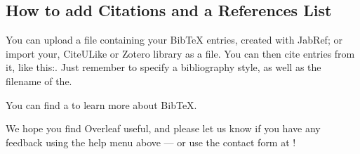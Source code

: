 \documentclass[a4paper]{article}
\begin{document}
\subsection{How to add Citations and a References List}

You can upload a file containing your BibTeX entries, created with JabRef; or import your, CiteULike or Zotero library as a file. You can then cite entries from it, like this:. Just remember to specify a bibliography style, as well as the filename of the.

You can find a to learn more about BibTeX.

We hope you find Overleaf useful, and please let us know if you have any feedback using the help menu above --- or use the contact form at !
\end{document}
